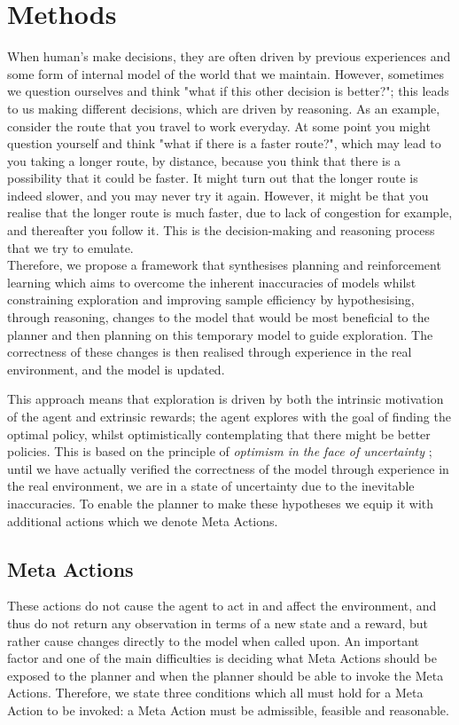 \chapter{Methods}
\label{chapter4}

When human's make decisions, they are often driven by previous experiences and some form of internal model of the world that we maintain. However, sometimes we question ourselves and think "what if this other decision is better?"; this leads to us making different decisions, which are driven by reasoning. As an example, consider the route that you travel to work everyday. At some point you might question yourself and think "what if there is a faster route?", which may lead to you taking a longer route, by distance, because you think that there is a possibility that it could be faster. It might turn out that the longer route is indeed slower, and you may never try it again. However, it might be that you realise that the longer route is much faster, due to lack of congestion for example, and thereafter you follow it. This is the decision-making and reasoning process that we try to emulate.
\\Therefore, we propose a framework that synthesises planning and reinforcement learning which aims to overcome the inherent inaccuracies of models whilst constraining exploration  and improving sample efficiency by hypothesising, through reasoning, changes to the model that would be most beneficial to the planner and then planning on this temporary model to guide exploration. The correctness of these changes is then realised through experience in the real environment, and the model is updated.

This approach means that exploration is driven by both the intrinsic motivation of the agent and extrinsic rewards; the agent explores with the goal of finding the optimal policy, whilst optimistically contemplating that there might be better policies. This is based on the principle of \textit{optimism in the face of uncertainty} \cite{lai-allocation}; until we have actually verified the correctness of the model through experience in the real environment, we are in a state of uncertainty due to the inevitable inaccuracies.
To enable the planner to make these hypotheses we equip it with additional actions which we denote Meta Actions.
\section{Meta Actions}
\label{sec:31}
These actions do not cause the agent to act in and affect the environment, and thus do not return any observation in terms of a new state and a reward, but rather cause changes directly to the model when called upon. An important factor and one of the main difficulties is deciding what Meta Actions should be exposed to the planner and when the planner should be able to invoke the Meta Actions. Therefore, we state three conditions which all must hold for a Meta Action to be invoked: a Meta Action must be admissible, feasible and reasonable.

